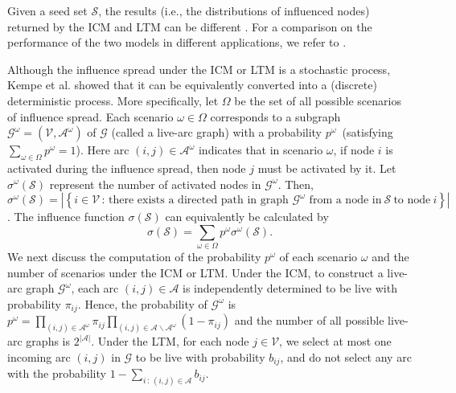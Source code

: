\documentclass[a4paper,10pt]{article}
\newcommand{\G}{\mathcal{G}}
\theoremstyle{plain}
\newcommand{\rev}[1]{{\color{black}#1}}
\newcommand{\revv}[1]{{#1}}
\begin{document}
	\rev{Given a seed set $\mathcal{S}$, the results (i.e., the distributions of influenced nodes) returned by the ICM and LTM can be different \cite{R1Chen2013}.
		For a comparison on the performance of the two models in different applications, we refer to \cite{akrouf2013social,li2017}.}
	
	Although the influence spread under the ICM or LTM is a stochastic process, Kempe et al. \cite{Kempe2003} showed that it can be equivalently converted into a (discrete) deterministic process. 
	More specifically, let $\Omega$ be the set of all possible scenarios of influence spread. Each scenario $\omega\in\Omega$ corresponds to a subgraph $\mathcal{G}^{\omega}=(\mathcal{V},\mathcal{A}^{\omega})$ of $\mathcal{G}$ (called a {live-arc} graph) with a probability $p^{\omega}$~(satisfying $\sum_{\omega\in\Omega}p^{\omega}=1$).
	Here arc $(i,j)\in\mathcal{A}^{\omega}$ indicates that in scenario $\omega$, if node $i$ is activated during the influence spread, then node $j$ must be activated by it.
	Let $\sigma^{\omega}(\mathcal{S})$ represent the number of  activated nodes in $\mathcal{G}^{\omega}$.
	Then, \revv{$\sigma^{\omega}(\mathcal{S})=|\left\{i\in\mathcal{V}\,:\, \text{there~exists~a~directed~path~in~graph~$\mathcal{G}^{\omega}$~from~a~node~in}~\mathcal{S}~\text{to~node}~i\right\}|$}. 
	The influence function $\sigma(\mathcal{S})$ can equivalently be calculated by
	\begin{equation}\label{triggermodel}
		\sigma(\mathcal{S})=\sum_{\omega\in\Omega}p^{\omega}\sigma^{\omega}(\mathcal{S}).
	\end{equation}
	We next discuss the computation of the probability $p^\omega$ of each scenario $\omega$ and the number of scenarios under the ICM or LTM.
	Under the ICM,  to construct a live-arc graph $\mathcal{G}^{\omega}$, each arc $(i,j) \in \mathcal{A}$ is independently determined to be live with probability $\pi_{ij}$.
	Hence, the probability of $\mathcal{G}^{\omega}$ is $p^{\omega}=\prod_{(i,j)\in\mathcal{A}^{\omega}}\pi_{ij}\prod_{(i,j)\in\mathcal{A}\backslash\mathcal{A}^{\omega}}(1-\pi_{ij})$ and the number of all possible live-arc graphs is $2^{|\mathcal{A}|}$.
	Under the LTM, for each node $j\in \mathcal{V}$, we select at most \revv{one incoming arc $(i,j)$ in $\G$} to be live with probability $b_{ij}$, and do not select any arc with the probability $1-\sum_{i\,:\,(i,j)\in\mathcal{A}}b_{ij}$.
\end{document}
